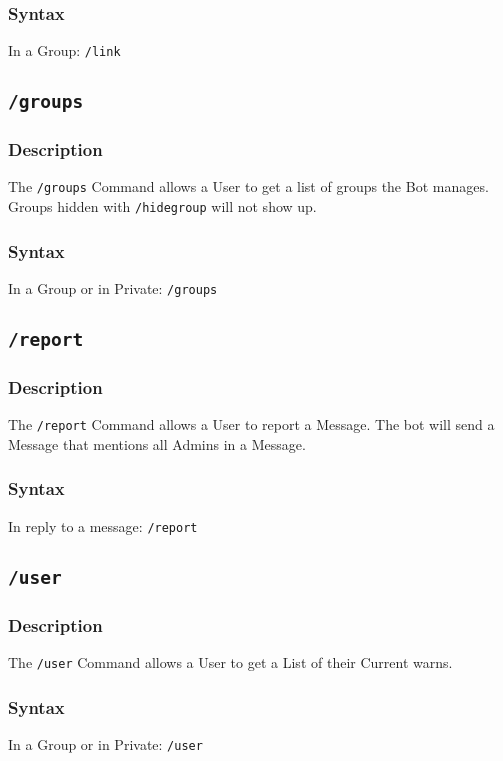 \documentclass[a4paper]{article}
\begin{document}
        \subsubsection*{Syntax}
            In a Group: \texttt{/link}\\
    \subsection{\texttt{/groups}}
        \subsubsection*{Description}
            The \texttt{/groups} Command allows a User to get a list of groups the Bot manages. Groups hidden with \texttt{/hidegroup} will not show up.

        \subsubsection*{Syntax}
            In a Group or in Private: \texttt{/groups}\\


    \subsection{\texttt{/report}}
        \subsubsection*{Description}
            The \texttt{/report} Command allows a User to report a Message. The bot will send a Message that mentions all Admins in a Message.

        \subsubsection*{Syntax}
            In reply to a message: \texttt{/report}\\

    \subsection{\texttt{/user}}
        \subsubsection*{Description}
            The \texttt{/user} Command allows a User to get a List of their Current warns.

        \subsubsection*{Syntax}
            In a Group or in Private: \texttt{/user}\\
\end{document}
